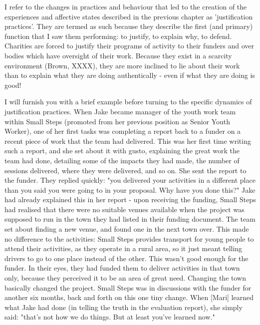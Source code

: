 I refer to the changes in practices and behaviour that led to the creation of the experiences and affective states described in the previous chapter as 'justification practices'. They are termed as such because they describe the first (and primary) function that I saw them performing: to justify, to explain why, to defend. Charities are forced to justify their programs of activity to their funders and over bodies which have oversight of their work. Because they exist in a scarcity environment (Brown, XXXX), they are more inclined to lie about their work than to explain what they are doing authentically - even if what they are doing is good!

I will furnish you with a brief example before turning to the specific dynamics of justification practices. When Jake became manager of the youth work team within Small Steps (promoted from her previous position as Senior Youth Worker), one of her first tasks was completing a report back to a funder on a recent piece of work that the team had delivered. This was her first time writing such a report, and she set about it with gusto, explaining the great work the team had done, detailing some of the impacts they had made, the number of sessions delivered, where they were delivered, and so on. She sent the report to the funder. They replied quickly: "you delivered your activities in a different place than you said you were going to in your proposal. Why have you done this?" Jake had already explained this in her report - upon receiving the funding, Small Steps had realised that there were no suitable venues available when the project was supposed to run in the town they had listed in their funding document. The team set about finding a new venue, and found one in the next town over. This made no difference to the activities: Small Steps provides transport for young people to attend their activities, as they operate in a rural area, so it just meant telling drivers to go to one place instead of the other. This wasn't good enough for the funder. In their eyes, they had funded them to deliver activities in that town only, because they perceived it to be an area of great need. Changing the town basically changed the project. Small Steps was in discussions with the funder for another six months, back and forth on this one tiny change. When [Mari] learned what Jake had done (in telling the truth in the evaluation report), she simply said: "that's not how we do things. But at least you've learned now."

